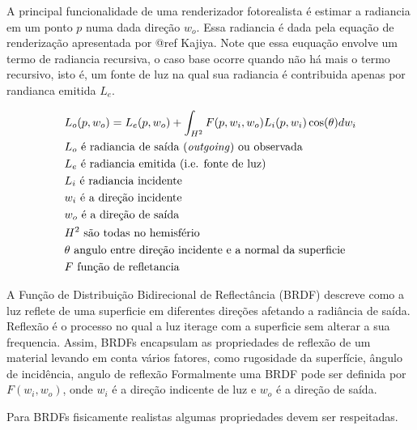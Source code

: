 \documentclass[english, 
               brazil, 
               bsc] %
               {dcomp-abntex2}
\begin{document}
A principal funcionalidade de uma renderizador fotorealista é estimar a radiancia em um ponto $p$ numa dada direção $w_o$. Essa radiancia é dada pela equação de renderização apresentada por @ref Kajiya. Note que essa euquação envolve um termo de radiancia recursiva, o caso base ocorre quando não há mais o termo recursivo, isto é, um fonte de luz na qual sua radiancia é contribuida apenas por randianca emitida $L_e$.

\begin{align*}
  &L_o(p, w_o) = L_e(p, w_o) + 
\int_{H^2}F(p, w_i, w_o){L_i(p,w_i)\cos(\theta)dw_i}\\
    &L_o \text{ é radiancia de saída (\textit{outgoing}) ou {observada}}\\
    &L_e \text{ é radiancia emitida (i.e. fonte de luz)}\\
    &L_i \text{ é radiancia incidente}\\
    &w_i \text{ é a direção incidente}\\
    &w_o \text{ é a direção de saída}\\
    &H^2 \text{ são todas no hemisfério}\\
    &\theta \text{ angulo entre direção incidente e a normal da superficie}\\
    &F \text{ função de refletancia}\\
\end{align*}

A Função de Distribuição Bidirecional de Reflectância (BRDF) descreve como a luz reflete de uma superficie em diferentes direções afetando a radiância de saída. Reflexão é o processo no qual a luz iterage com a superficie sem alterar a sua frequencia. Assim, BRDFs encapsulam as propriedades de reflexão de um material levando em conta vários fatores, como rugosidade da superfície, ângulo de incidência, angulo de reflexão
Formalmente uma BRDF pode ser definida por $F(w_i, w_o)$, onde $w_i$ é a direção indicente de luz e $w_o$ é a direção de saída.

Para BRDFs fisicamente realistas algumas propriedades devem ser respeitadas.
\end{document}
